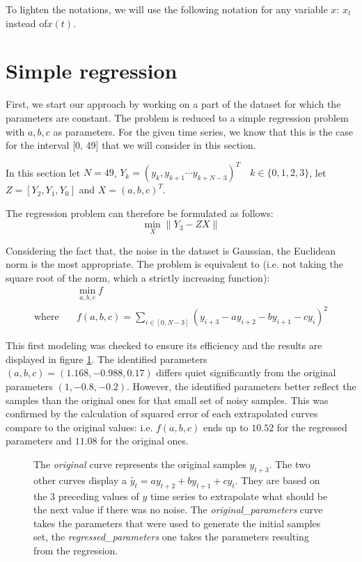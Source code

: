 \documentclass[11pt]{article}
\begin{document}
    To lighten the notations, we will use the following notation for any variable $x$: $x_t$ instead of$x(t)$.

\section{Simple regression}
    \label{section:regression}
    First, we start our approach by working on a part of the dataset for which the parameters are constant. The problem is reduced to a simple regression problem with $a, b, c$ as parameters. For the given time series, we know that this is the case for the interval [0, 49] that we will consider in this section.

    In this section let $N=49$, $Y_k = (y_k, y_{k+1} \cdots y_{k+N-3})^T \quad k \in \{0,1,2,3\}$, let $Z=[Y_2, Y_1, Y_0]$ and $X=(a, b, c)^T$.
    
    The regression problem can therefore be formulated as follows:
    $$ \min_{X}{\lVert Y_3 - ZX \rVert} $$

    Considering the fact that, the noise in the dataset is Gaussian, the Euclidean norm is the most appropriate. The problem is equivalent to (i.e. not taking the square root of the norm, which a strictly increasing function):           
     \begin{equation*}
        \begin{aligned}
            & \min_{a,b,c}{f} \\
            \text{where} \quad &f(a,b,c) =  \sum_{i\in[0, N-3]}{(y_{i+3}  - a y_{i+2} - b  y_{i+1} - c y_i)^2}
        \end{aligned}
     \end{equation*}
                
    This first modeling was checked to ensure its efficiency and the results are displayed in figure \ref{fig:regression}. The identified parameters $(a, b, c) = (1.168, -0.988, 0.17)$ differs quiet significantly from the original parameters $(1, -0.8, -0.2)$. However, the identified parameters better reflect the samples than the original ones for that small set of noisy samples. This was confirmed by the calculation of squared error of each extrapolated curves compare to the original values: i.e. $f(a,b,c)$ ends up to $10.52$ for the regressed parameters and $11.08$ for the original ones.

    \begin{figure}[h]
        \centering
        
        \caption{\label{fig:regression} The \emph{original} curve represents the original samples $y_{t+3}$. The two other curves display a $\tilde{y_t} = ay_{t+2} + by_{t+1}+cy_t$. They are based on the 3 preceding values of $y$ time series to extrapolate what should be the next value if there was no noise. The \emph{original\_parameters} curve takes the parameters that were used to generate the initial samples set, the \emph{regressed\_parameters} one takes the parameters resulting from the regression.}
    \end{figure}
    
\end{document}
